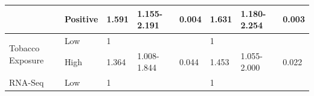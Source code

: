 \documentclass[cancers,article,submit,moreauthors,pdftex]{Definitions/mdpi}
\begin{document}
\begin{table}[!hp]
{\begin{tabular}{|l|l|l|l|l|l|l|l|}
\cline{2-8}
                                        & Positive                                                                            & 1.591                                                                          & 1.155-2.191                                                                   & \textcolor[rgb]{1,0.149,0}{0.004}                                             & 1.631                                                                          & 1.180-2.254                                                                   & \textcolor[rgb]{1,0.149,0}{0.003}                                              \\ 
\hline
\multirow{2}{*}{Tobacco Exposure}       & {\cellcolor[rgb]{0.62,0.812,0.878}}Low                                              & {\cellcolor[rgb]{0.62,0.812,0.878}}1                                           & {\cellcolor[rgb]{0.62,0.812,0.878}}                                           & {\cellcolor[rgb]{0.62,0.812,0.878}}                                           & {\cellcolor[rgb]{0.62,0.812,0.878}}1                                           & {\cellcolor[rgb]{0.62,0.812,0.878}}                                           & {\cellcolor[rgb]{0.62,0.812,0.878}}                                            \\ 
\cline{2-8}
                                        & High                                                                                & 1.364                                                                          & 1.008-1.844                                                                   & \textcolor[rgb]{1,0.149,0}{0.044}                                             & 1.453                                                                          & 1.055-2.000                                                                   & \textcolor[rgb]{1,0.149,0}{0.022}                                              \\ 
\hline
\multirow{2}{*}{RNA-Seq}                & {\cellcolor[rgb]{0.62,0.812,0.878}}Low                                              & {\cellcolor[rgb]{0.62,0.812,0.878}}1                                           & {\cellcolor[rgb]{0.62,0.812,0.878}}                                           & {\cellcolor[rgb]{0.62,0.812,0.878}}                                           & {\cellcolor[rgb]{0.62,0.812,0.878}}1                                           & {\cellcolor[rgb]{0.62,0.812,0.878}}                                           & {\cellcolor[rgb]{0.62,0.812,0.878}}                                            \\ 

\end{tabular}}
\end{table}
\end{document}
